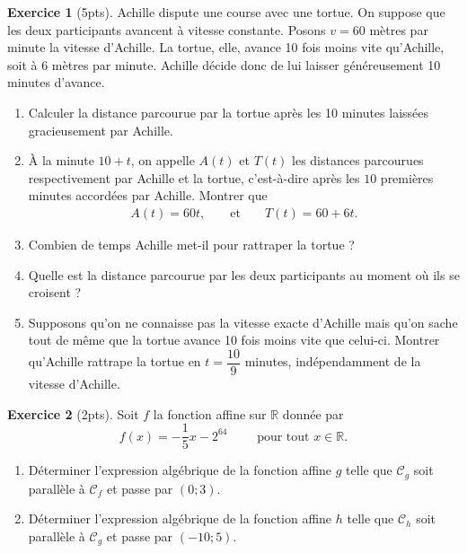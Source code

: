 \documentclass[12pt]{paper}
\theoremstyle{theorem}
\theoremstyle{definition}
\newtheorem{ex}{Exercice}
\newcommand{\C}{\mathcal{C}}
\newcommand{\R}{\mathbb{R}}
\newcommand{\exe}[2]{
		\begin{ex} #1  \end{ex}
		\begin{sol} #2 \end{sol}
	}
\newcommand{\exe}[2]{
		\begin{ex} #1  \end{ex}
	}
\begin{document}

\exe{[5pts]
    Achille dispute une course avec une tortue. On suppose que les deux participants avancent à vitesse constante. Posons $v = 60$ mètres par minute la vitesse d'Achille.
    La tortue, elle, avance 10 fois moins vite qu’Achille, soit à $6$ mètres par minute. 
    Achille décide donc de lui laisser généreusement 10 minutes d’avance.

    
	\begin{enumerate}
        \item Calculer la distance parcourue par la tortue après les 10 minutes laissées gracieusement par Achille.
        \item \`A la minute $10+t$, on appelle $A(t)$ et $T(t)$ les distances parcourues respectivement par Achille et la tortue, c'est-à-dire après les $10$ premières minutes accordées par Achille.
        Montrer que
            \begin{align*}
                A(t) = 60 t, && \text{ et } && T(t) = 60 + 6t.
            \end{align*}
        \item Combien de temps Achille met-il pour rattraper la tortue ?
        \item Quelle est la distance parcourue par les deux participants au moment où ils se croisent ?
        \item Supposons qu'on ne connaisse pas la vitesse exacte d'Achille mais qu'on sache tout de même que la tortue avance 10 fois moins vite que celui-ci.
        Montrer qu'Achille rattrape la tortue en $t = \dfrac{10}{9}$ minutes, indépendamment de la vitesse d'Achille.
	\end{enumerate}
	
}{}
\newpage

\exe{[2pts]
	Soit $f$ la fonction affine sur $\R$ donnée par
		\[ f(x) = -\frac15 x - 2^{64} \qquad \text{ pour tout } x\in\R. \]
	\begin{enumerate}
		\item
		Déterminer l'expression algébrique de la fonction affine $g$ telle que $\C_g$ soit parallèle à $\C_f$ et passe par $(0;3)$.
		\item
		Déterminer l'expression algébrique de la fonction affine $h$ telle que $\C_h$ soit parallèle à $\C_g$ et passe par $(-10;5)$.
	\end{enumerate}
}{}
\end{document}
